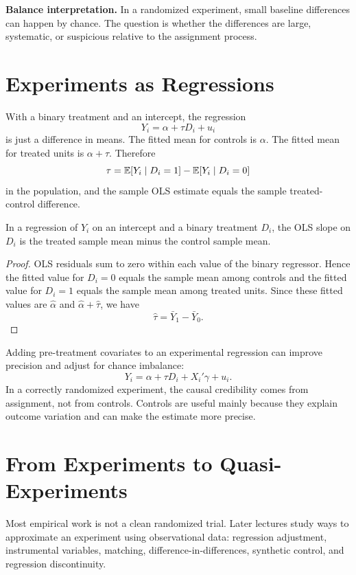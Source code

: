 \begin{boxD}
\textbf{Balance interpretation.} In a randomized experiment, small baseline
differences can happen by chance. The question is whether the differences are
large, systematic, or suspicious relative to the assignment process.
\end{boxD}

\section{Experiments as Regressions}

With a binary treatment and an intercept, the regression
\[
    Y_i = \alpha + \tau D_i + u_i
\]
is just a difference in means. The fitted mean for controls is \(\alpha\). The
fitted mean for treated units is \(\alpha+\tau\). Therefore
\[
    \tau
    =
    \mathbb{E}[Y_i\mid D_i=1]-\mathbb{E}[Y_i\mid D_i=0]
\]
in the population, and the sample OLS estimate equals the sample treated-control
difference.

\begin{thmN}
In a regression of \(Y_i\) on an intercept and a binary treatment \(D_i\), the
OLS slope on \(D_i\) is the treated sample mean minus the control sample mean.
\end{thmN}

\begin{proof}
OLS residuals sum to zero within each value of the binary regressor. Hence the
fitted value for \(D_i=0\) equals the sample mean among controls and the fitted
value for \(D_i=1\) equals the sample mean among treated units. Since these
fitted values are \(\hat{\alpha}\) and \(\hat{\alpha}+\hat{\tau}\), we have
\[
    \hat{\tau}=\bar{Y}_1-\bar{Y}_0.
\]
\end{proof}

Adding pre-treatment covariates to an experimental regression can improve
precision and adjust for chance imbalance:
\[
    Y_i=\alpha+\tau D_i+X_i'\gamma+u_i.
\]
In a correctly randomized experiment, the causal credibility comes from
assignment, not from controls. Controls are useful mainly because they explain
outcome variation and can make the estimate more precise.

\section{From Experiments to Quasi-Experiments}

Most empirical work is not a clean randomized trial. Later lectures study ways
to approximate an experiment using observational data: regression adjustment,
instrumental variables, matching, difference-in-differences, synthetic control,
and regression discontinuity.

